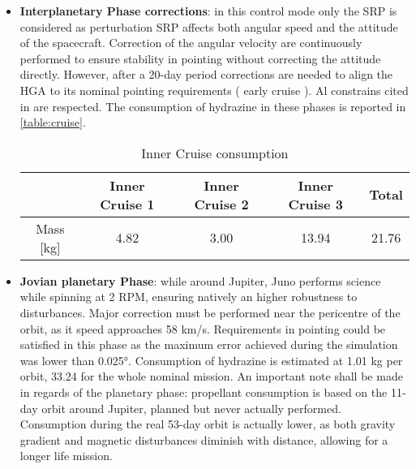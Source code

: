 \begin{itemize}
    \item \textbf{Interplanetary Phase corrections}: in this control mode only the SRP is considered as perturbation SRP affects both angular speed and the attitude of the spacecraft. Correction of the angular velocity are continuously performed to ensure stability in pointing without correcting the attitude directly. However, after a 20-day period corrections are needed to align the HGA to its nominal pointing requirements \mref ( early cruise ). Al constrains cited in \mref are respected. 
    The consumption of hydrazine in these phases is reported in \autoref{table:cruise}.

    \begin{table}[H]
        \renewcommand{\arraystretch}{1.3}
        \centering
        \begin{tabular}{|c|c|c|c|c|}
            \hline
            &\textbf{Inner Cruise 1} &\textbf{Inner Cruise 2} & \textbf{Inner Cruise 3} &\textbf{Total}\\
            \hline
            \hline
            Mass [kg] & 4.82 & 3.00 & 13.94 & 21.76 \\
            \hline
        \end{tabular}
        \caption{Inner Cruise consumption}
        \label{table:cruise}
    \end{table}

    \item \textbf{Jovian planetary Phase}: while around Jupiter, Juno performs science while spinning at 2 RPM, ensuring natively an higher robustness to disturbances. Major correction must be performed near the pericentre of the orbit, as it speed approaches 58 km/s.  
    Requirements in pointing could be satisfied in this phase as the maximum error achieved during the simulation was lower than 0.025°.  Consumption of hydrazine is estimated at 1.01 kg per orbit, 33.24 for the whole nominal mission.
    An important note shall be made in regards of the planetary phase: propellant consumption is based on the 11-day orbit around Jupiter, planned but never actually performed. Consumption during the real 53-day orbit is actually lower, as both gravity gradient and magnetic disturbances diminish with distance, allowing for a longer life mission. 
    
\end{itemize}



